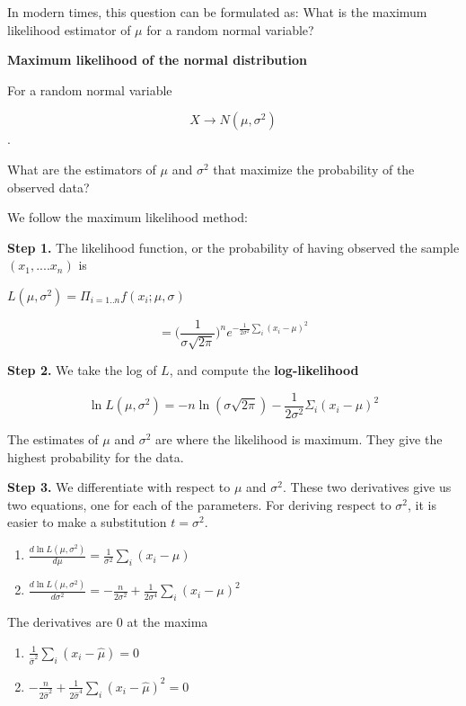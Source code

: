 \documentclass[
]{book}
\providecommand{\tightlist}{%
  \setlength{\itemsep}{0pt}\setlength{\parskip}{0pt}}
\begin{document}
In modern times, this question can be formulated as: What is the maximum likelihood estimator of \(\mu\) for a random normal variable?

\textbf{Maximum likelihood of the normal distribution}

For a random normal variable

\[X \rightarrow N(\mu, \sigma^2)\].

What are the estimators of \(\mu\) and \(\sigma^2\) that maximize the probability of the observed data?

We follow the maximum likelihood method:

\textbf{Step 1.} The likelihood function, or the probability of having observed the sample \((x_1, ....x_n)\) is

\(L(\mu, \sigma^2)=\Pi_{i=1..n} f(x_i;\mu,\sigma)\)

\[=\big( \frac{1}{\sigma \sqrt{2 \pi}}\big)^n e^{-\frac{1}{2\sigma^2} \sum_i(x_i-\mu)^2}\]

\textbf{Step 2.} We take the log of \(L\), and compute the \textbf{log-likelihood}

\[\ln L(\mu, \sigma^2)=-n \ln(\sigma \sqrt{2 \pi})-\frac{1}{2\sigma^2} \Sigma_i(x_i-\mu)^2\]

The estimates of \(\mu\) and \(\sigma^2\) are where the likelihood is maximum. They give the highest probability for the data.

\textbf{Step 3.} We differentiate with respect to \(\mu\) and \(\sigma^2\). These two derivatives give us two equations, one for each of the parameters. For deriving respect to \(\sigma^2\), it is easier to make a substitution \(t=\sigma^2\).

\begin{enumerate}
\def\labelenumi{\alph{enumi})}
\item
  \(\frac{d \ln L(\mu, \sigma^2)}{d\mu}=\frac{1}{\sigma^2} \sum_i(x_i-\mu)\)
\item
  \(\frac{d \ln L(\mu, \sigma^2)}{d\sigma^2}=-\frac{n}{2 \sigma^2}+\frac{1}{2\sigma^4} \sum_i(x_i-\mu)^2\)
\end{enumerate}

The derivatives are \(0\) at the maxima

\begin{enumerate}
\def\labelenumi{\alph{enumi})}
\tightlist
\item
  \(\frac{1}{\hat{\sigma}^2} \sum_i(x_i-\hat{\mu})=0\)
\item
  \(-\frac{n}{2 \hat{\sigma}^2}+\frac{1}{2\hat{\sigma}^4} \sum_i(x_i-\hat{\mu})^2=0\)
\end{enumerate}
\end{document}
